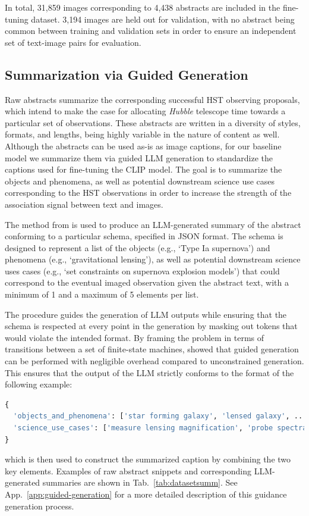 \documentclass[10pt]{article} %
\newcommand{\hubble}{\emph{Hubble}\xspace}
\begin{document}
In total, 31,859 images corresponding to 4,438 abstracts are included in the fine-tuning dataset. 3,194 images are held out for validation, with no abstract being common between training and validation sets in order to ensure an independent set of text-image pairs for evaluation.


\subsection{Summarization via Guided Generation}
\label{sec:summarization}

Raw abstracts summarize the corresponding successful HST observing proposals, which intend to make the case for allocating \hubble telescope time towards a particular set of observations. These abstracts are written in a diversity of styles, formats, and lengths, being highly variable in the nature of content as well. Although the abstracts can be used as-is as image captions, for our baseline model we summarize them via guided LLM generation to standardize the captions used for fine-tuning the CLIP model. The goal is to summarize the objects and phenomena, as well as potential downstream science use cases corresponding to the HST observations in order to increase the strength of the association signal between text and images.

The method from \cite{willard2023efficient} is used to produce an LLM-generated summary of the abstract conforming to a particular schema, specified in JSON format. The schema is designed to represent a list of the objects (e.g., `Type Ia supernova') and phenomena (e.g., `gravitational lensing'), as well as potential downstream science uses cases (e.g., `set constraints on supernova explosion models') that could correspond to the eventual imaged observation given the abstract text, with a minimum of 1 and a maximum of 5 elements per list.

The procedure guides the generation of LLM outputs while ensuring that the schema is respected at every point in the generation by masking out tokens that would violate the intended format. By framing the problem in terms of transitions between a set of finite-state machines, \cite{willard2023efficient} showed that guided generation can be performed with negligible overhead compared to unconstrained generation. This ensures that the output of the LLM strictly conforms to the format of the following example:
\begin{lstlisting}[language=Python]
{
  'objects_and_phenomena': ['star forming galaxy', 'lensed galaxy', ...], 
  'science_use_cases': ['measure lensing magnification', 'probe spectral energy distributions', ...]
}
\end{lstlisting}
which is then used to construct the summarized caption by combining the two key elements. Examples of raw abstract snippets and corresponding LLM-generated summaries are shown in Tab.~\ref{tab:datasetsumm}. See App.~\ref{app:guided-generation} for a more detailed description of this guidance generation process.
\end{document}
